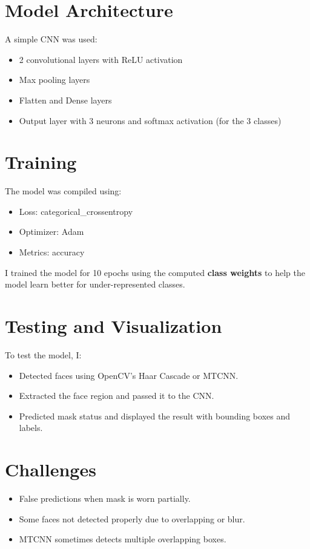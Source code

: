 \documentclass[12pt]{article}
\begin{document}
\section*{Model Architecture}
A simple CNN was used:
\begin{itemize}
    \item 2 convolutional layers with ReLU activation
    \item Max pooling layers
    \item Flatten and Dense layers
    \item Output layer with 3 neurons and softmax activation (for the 3 classes)
\end{itemize}

\section*{Training}
The model was compiled using:
\begin{itemize}
    \item Loss: categorical\_crossentropy
    \item Optimizer: Adam
    \item Metrics: accuracy
\end{itemize}

I trained the model for 10 epochs using the computed \textbf{class weights} to help the model learn better for under-represented classes.

\section*{Testing and Visualization}
To test the model, I:
\begin{itemize}
    \item Detected faces using OpenCV’s Haar Cascade or MTCNN.
    \item Extracted the face region and passed it to the CNN.
    \item Predicted mask status and displayed the result with bounding boxes and labels.
\end{itemize}

\section*{Challenges}
\begin{itemize}
    \item False predictions when mask is worn partially.
    \item Some faces not detected properly due to overlapping or blur.
    \item MTCNN sometimes detects multiple overlapping boxes.
\end{itemize}
\end{document}
